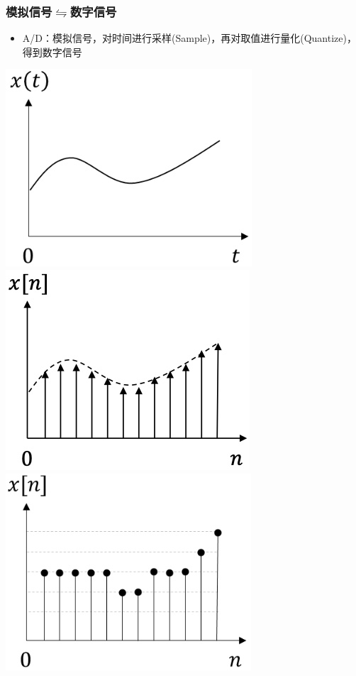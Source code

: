 \documentclass[CJKutf8,dvipsnames,table]{beamer}
\begin{document}
\begin{CJK*}{UTF8}{song}
  \begin{frame}
    \frametitle{模拟信号$\leftrightharpoons$数字信号} 
    \begin{itemize}
    \item A/D：模拟信号，对时间进行采样(Sample)，再对取值进行量化(Quantize)，得到数字信号
    \end{itemize}
	    \begin{center}
	    	\includegraphics[scale=0.3]{contisignal}  
			\hspace{1mm}
	    	\includegraphics[scale=0.3]{samplesignal}  
			\hspace{1mm}
	    	\includegraphics[scale=0.3]{discretesignal}    

\end{center}
\end{frame}
\end{CJK*}
\end{document}
